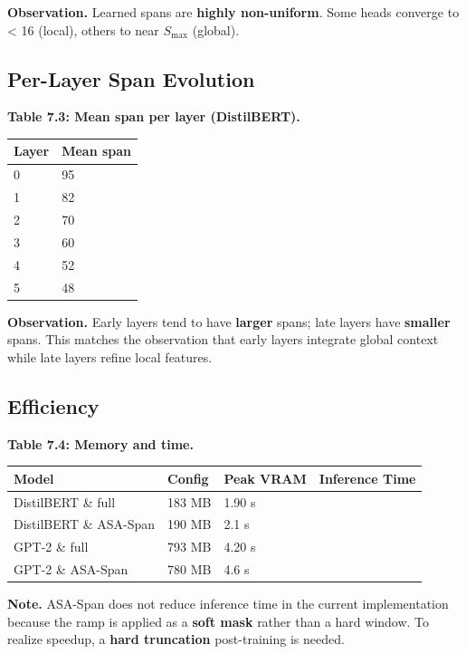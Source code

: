 \textbf{Observation.} Learned spans are \textbf{highly non-uniform}. Some heads 
converge to < 16 (local), others to near $S_\text{max}$ (global).

\subsection{Per-Layer Span Evolution}

\textbf{Table 7.3: Mean span per layer (DistilBERT).}

\begin{table}[H]
\centering
\small
\begin{tabular}{ll}
\toprule
\textbf{Layer} & \textbf{Mean span} \\
\midrule
0 & 95 \\
1 & 82 \\
2 & 70 \\
3 & 60 \\
4 & 52 \\
5 & 48 \\
\bottomrule
\end{tabular}
\end{table}

\textbf{Observation.} Early layers tend to have \textbf{larger} spans; late layers 
have \textbf{smaller} spans. This matches the observation that early layers 
integrate global context while late layers refine local features.

\subsection{Efficiency}

\textbf{Table 7.4: Memory and time.}

\begin{table}[H]
\centering
\small
\begin{tabular}{llll}
\toprule
\textbf{Model} & \textbf{Config} & \textbf{Peak VRAM} & \textbf{Inference Time} \\
\midrule
DistilBERT \& full & 183 MB & 1.90 s \\
DistilBERT \& ASA-Span & 190 MB & 2.1 s \\
GPT-2 \& full & 793 MB & 4.20 s \\
GPT-2 \& ASA-Span & 780 MB & 4.6 s \\
\bottomrule
\end{tabular}
\end{table}

\textbf{Note.} ASA-Span does not reduce inference time in the current implementation 
because the ramp is applied as a \textbf{soft mask} rather than a hard window. 
To realize speedup, a \textbf{hard truncation} post-training is needed.

